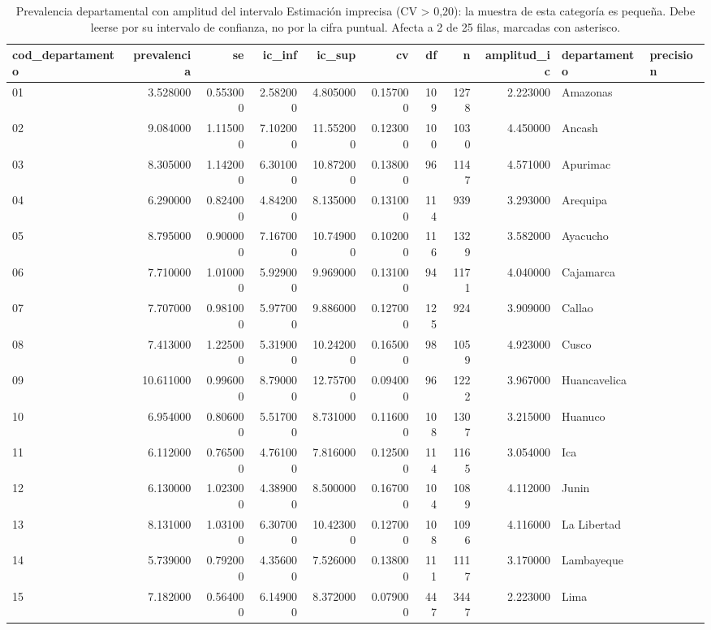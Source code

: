 \begin{table}[htbp]
\caption{Prevalencia departamental con amplitud del intervalo Estimación imprecisa (CV > 0,20): la muestra de esta categoría es pequeña. Debe leerse por su intervalo de confianza, no por la cifra puntual. Afecta a 2 de 25 filas, marcadas con asterisco.}
\label{tab:tabla_48_prevalencia_departamental_geo}
\begin{tabular}{lrrrrrrrrll}
\toprule
cod\_departamento & prevalencia & se & ic\_inf & ic\_sup & cv & df & n & amplitud\_ic & departamento & precision \\
\midrule
01 & 3.528000 & 0.553000 & 2.582000 & 4.805000 & 0.157000 & 109 & 1278 & 2.223000 & Amazonas &  \\
02 & 9.084000 & 1.115000 & 7.102000 & 11.552000 & 0.123000 & 100 & 1030 & 4.450000 & Ancash &  \\
03 & 8.305000 & 1.142000 & 6.301000 & 10.872000 & 0.138000 & 96 & 1147 & 4.571000 & Apurimac &  \\
04 & 6.290000 & 0.824000 & 4.842000 & 8.135000 & 0.131000 & 114 & 939 & 3.293000 & Arequipa &  \\
05 & 8.795000 & 0.900000 & 7.167000 & 10.749000 & 0.102000 & 116 & 1329 & 3.582000 & Ayacucho &  \\
06 & 7.710000 & 1.010000 & 5.929000 & 9.969000 & 0.131000 & 94 & 1171 & 4.040000 & Cajamarca &  \\
07 & 7.707000 & 0.981000 & 5.977000 & 9.886000 & 0.127000 & 125 & 924 & 3.909000 & Callao &  \\
08 & 7.413000 & 1.225000 & 5.319000 & 10.242000 & 0.165000 & 98 & 1059 & 4.923000 & Cusco &  \\
09 & 10.611000 & 0.996000 & 8.790000 & 12.757000 & 0.094000 & 96 & 1222 & 3.967000 & Huancavelica &  \\
10 & 6.954000 & 0.806000 & 5.517000 & 8.731000 & 0.116000 & 108 & 1307 & 3.215000 & Huanuco &  \\
11 & 6.112000 & 0.765000 & 4.761000 & 7.816000 & 0.125000 & 114 & 1165 & 3.054000 & Ica &  \\
12 & 6.130000 & 1.023000 & 4.389000 & 8.500000 & 0.167000 & 104 & 1089 & 4.112000 & Junin &  \\
13 & 8.131000 & 1.031000 & 6.307000 & 10.423000 & 0.127000 & 108 & 1096 & 4.116000 & La Libertad &  \\
14 & 5.739000 & 0.792000 & 4.356000 & 7.526000 & 0.138000 & 111 & 1117 & 3.170000 & Lambayeque &  \\
15 & 7.182000 & 0.564000 & 6.149000 & 8.372000 & 0.079000 & 447 & 3447 & 2.223000 & Lima &  \\

\end{tabular}
\end{table}
